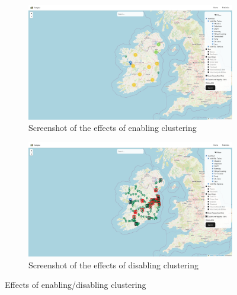 \documentclass[a4paper,11pt]{report}
\begin{document}
\begin{figure}[H]
    \centering
    \begin{subfigure}[c]{0.49\textwidth}
        \centering
        \includegraphics[width=\textwidth]{./images/clusteringenabled.png}
        \caption{Screenshot of the effects of enabling clustering}
    \end{subfigure}
    \hfill
    \begin{subfigure}[c]{0.49\textwidth}
        \centering
        \includegraphics[width=\textwidth]{./images/clusteringdisabled.png}
        \caption{Screenshot of the effects of disabling clustering}
    \end{subfigure}
    \caption{Effects of enabling/disabling clustering}
\end{figure}
\end{document}
